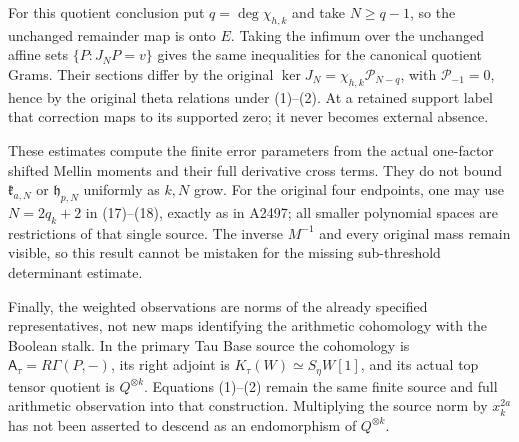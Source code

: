 For this quotient conclusion put \(q=\deg\chi_{h,k}\) and take
\(N\ge q-1\), so the unchanged remainder map is onto \(E\).
Taking the infimum over the unchanged affine sets
\(\{P:J_NP=v\}\) gives the same inequalities for the canonical
quotient Grams. Their sections differ by the original
\(\ker J_N=\chi_{h,k}\mathcal P_{N-q}\), with
\(\mathcal P_{-1}=0\), hence by the original theta
relations under (1)--(2). At a retained support label that correction
maps to its supported zero; it never becomes external absence.

These estimates compute the finite error parameters from the actual
one-factor shifted Mellin moments and their full derivative cross
terms. They do not bound \(\mathfrak k_{a,N}\) or
\(\mathfrak h_{p,N}\) uniformly as \(k,N\) grow. For the original
four endpoints, one may use \(N=2q_k+2\) in (17)--(18), exactly as
in A2497; all smaller polynomial spaces are restrictions of that
single source. The inverse \(M^{-1}\) and every original mass remain
visible, so this result cannot be mistaken for the missing
sub-threshold determinant estimate.

Finally, the weighted observations are norms of the already specified
representatives, not new maps identifying the arithmetic cohomology
with the Boolean stalk. In the primary Tau Base source the cohomology
is \(\mathsf A_\tau=R\Gamma(P,-)\), its right adjoint is
\(K_\tau(W)\simeq S_\eta W[1]\), and its actual top tensor quotient
is \(Q^{\otimes k}\). Equations (1)--(2) remain the same finite source
and full arithmetic observation into that construction. Multiplying
the source norm by \(x_k^{2a}\) has not been asserted to descend as
an endomorphism of \(Q^{\otimes k}\).
\endgroup
